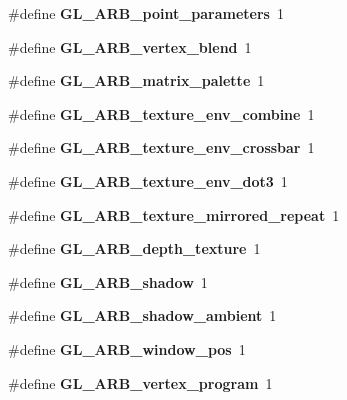 \begin{DoxyCompactItemize}
\item 
\#define {\bfseries G\+L\+\_\+\+A\+R\+B\+\_\+point\+\_\+parameters}~1\label{_s_d_l__opengl_8h_a9cf12ee14c00a9809a33576387d86e62}

\item 
\#define {\bfseries G\+L\+\_\+\+A\+R\+B\+\_\+vertex\+\_\+blend}~1\label{_s_d_l__opengl_8h_a006ef5956937df7cdac5b5ec22e5ec66}

\item 
\#define {\bfseries G\+L\+\_\+\+A\+R\+B\+\_\+matrix\+\_\+palette}~1\label{_s_d_l__opengl_8h_a1c6d5bc4735aec73692aabe13db4aaa5}

\item 
\#define {\bfseries G\+L\+\_\+\+A\+R\+B\+\_\+texture\+\_\+env\+\_\+combine}~1\label{_s_d_l__opengl_8h_a0ee8255b797184209d48b8761b6765b9}

\item 
\#define {\bfseries G\+L\+\_\+\+A\+R\+B\+\_\+texture\+\_\+env\+\_\+crossbar}~1\label{_s_d_l__opengl_8h_ae91e790f2cbb2f4fb96f53a6cf7f9e4b}

\item 
\#define {\bfseries G\+L\+\_\+\+A\+R\+B\+\_\+texture\+\_\+env\+\_\+dot3}~1\label{_s_d_l__opengl_8h_af9abd4bf01d7f384ad68c3c12021c8a6}

\item 
\#define {\bfseries G\+L\+\_\+\+A\+R\+B\+\_\+texture\+\_\+mirrored\+\_\+repeat}~1\label{_s_d_l__opengl_8h_af4bb1bdda277066491b8557de9306bb9}

\item 
\#define {\bfseries G\+L\+\_\+\+A\+R\+B\+\_\+depth\+\_\+texture}~1\label{_s_d_l__opengl_8h_a7fd680d43589db44c71de25015f07df2}

\item 
\#define {\bfseries G\+L\+\_\+\+A\+R\+B\+\_\+shadow}~1\label{_s_d_l__opengl_8h_a7536a76a0ec993ff52606fdf34897d61}

\item 
\#define {\bfseries G\+L\+\_\+\+A\+R\+B\+\_\+shadow\+\_\+ambient}~1\label{_s_d_l__opengl_8h_aca5766bd9b28140fe2e176c33bf033f2}

\item 
\#define {\bfseries G\+L\+\_\+\+A\+R\+B\+\_\+window\+\_\+pos}~1\label{_s_d_l__opengl_8h_aefd5aad050e1dcadaac885d7a621c3a1}

\item 
\#define {\bfseries G\+L\+\_\+\+A\+R\+B\+\_\+vertex\+\_\+program}~1\label{_s_d_l__opengl_8h_a57697ccb2797770a75667f8ed104aa41}


\end{DoxyCompactItemize}
